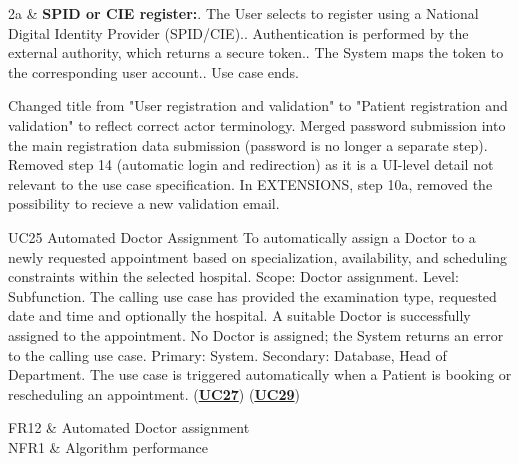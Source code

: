 \begin{ucsubvariations}
    2a & \textbf{SPID or CIE register:}. The User selects to register using a National Digital Identity Provider (SPID/CIE).. Authentication is performed by the external authority, which returns a secure token.. The System maps the token to the corresponding user account.. Use case ends. \\ \hline
\end{ucsubvariations}


\begin{ucedits}
Changed title from "User registration and validation" to "Patient registration and validation" to reflect correct actor terminology.
Merged password submission into the main registration data submission (password is no longer a separate step).
Removed step 14 (automatic login and redirection) as it is a UI-level detail not relevant to the use case specification.
In EXTENSIONS, step 10a, removed the possibility to recieve a new validation email.
\end{ucedits}

{}
\hypertarget{UC25}{}
\usecaseheader
  {UC25} %
  {Automated Doctor Assignment} %
  {To automatically assign a Doctor to a newly requested appointment based on specialization, availability, and scheduling constraints within the selected hospital.} %
  {Scope: Doctor assignment. Level: Subfunction.} %
  {The calling use case has provided the examination type, requested date and time and optionally the hospital.} %
  {A suitable Doctor is successfully assigned to the appointment.} %
  {No Doctor is assigned; the System returns an error to the calling use case.} %
  {Primary: System. Secondary: Database, Head of Department.} %
  {The use case is triggered automatically when a Patient is booking or rescheduling an appointment. (\textbf{\hyperlink{UC27}{UC27}}) (\textbf{\hyperlink{UC29}{UC29}})} %


\begin{ucrequirements}
    FR12 & Automated Doctor assignment\\ \hline
    NFR1 & Algorithm performance\\ \hline
\end{ucrequirements}


